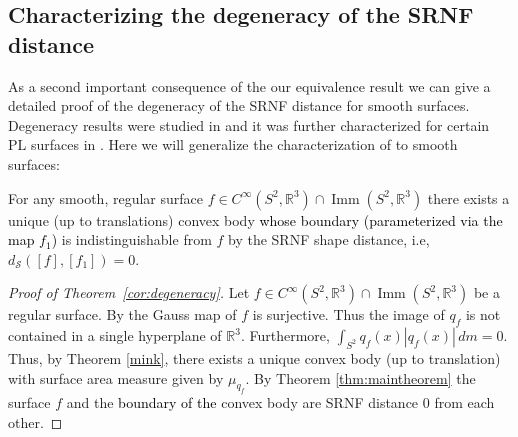 \documentclass[final,hidelinks,onefignum,onetabnum]{siamart220329}
\newcommand{\R}{\mathbb{R}}
\newcommand{\Imm}{\operatorname{Imm}}
\begin{document}
\subsection{Characterizing the degeneracy of the SRNF distance}
As a second important consequence of the our equivalence result we can give a detailed proof of the degeneracy of the SRNF distance for smooth surfaces. Degeneracy results were studied in \cite{klassen2020closed} and it was further characterized for certain PL  surfaces in \cite{bauer2022SRNF}. Here we will generalize the characterization of \cite{bauer2022SRNF} to smooth surfaces:
\begin{theorem}\label{cor:degeneracy}
For any smooth, regular surface $f\in C^\infty(S^2,\R^3)\cap \Imm(S^2,\mathbb R^3)$ there exists a unique (up to translations) convex body \textcolor{black}{whose boundary (parameterized via the map $f_1$)} is indistinguishable from $f$ by the SRNF shape distance, i.e, $ d_{\mathcal S}([f],[f_1])=0$.
\end{theorem}
\begin{proof}[Proof of Theorem~\ref{cor:degeneracy}]
    Let $f\in C^\infty(S^2,\R^3)\cap \Imm(S^2,\mathbb R^3)$ be a regular surface. By \cite[Prop. 4.33]{tapp2016differential} the Gauss map of $f$ is surjective.
   Thus the image of $q_f$ is not contained in a single hyperplane of $\R^3$. Furthermore, $\int_{S^2}q_f(x)|q_f(x)|\,dm=0$. Thus, by Theorem \ref{mink}, there exists a unique convex body (up to translation) with surface area measure given by $\mu_{q_f}$. By Theorem \ref{thm:maintheorem} the surface $f$ and the \textcolor{black}{boundary of the} convex body are SRNF distance 0 from each other. 
\end{proof}
\end{document}
